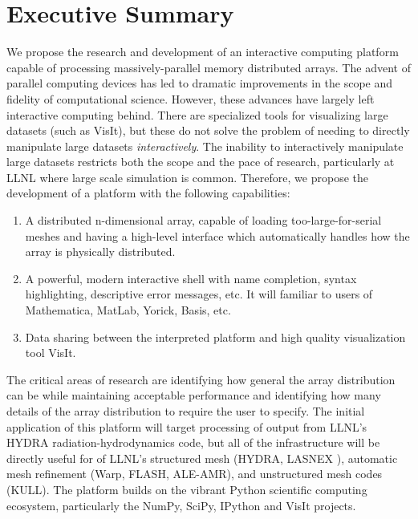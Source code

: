 \documentclass[letterpaper,12pt]{article}
\begin{document}



\setlength{\parindent}{15pt}
\section*{Executive Summary }
We propose the research and development of an interactive computing platform capable of processing massively-parallel memory distributed arrays.  The advent of parallel computing devices has led to dramatic improvements in the scope and fidelity of computational science.  However, these advances have largely left interactive computing behind.  There are specialized tools for visualizing large datasets (such as VisIt\cite{VisIt}), but these do not solve the problem of needing to directly manipulate large datasets \emph{interactively}.  The inability to interactively manipulate large datasets restricts both the scope and the pace of research, particularly at LLNL where large scale simulation is common.  Therefore, we propose the development of a platform with the following capabilities:

\begin{enumerate}
	\item A distributed n-dimensional array, capable of loading too-large-for-serial meshes 
          and having a high-level interface which automatically handles how 
          the array is physically distributed.

	\item A powerful, modern interactive shell with name completion, syntax highlighting, descriptive error messages, etc.  It will familiar to users of Mathematica, MatLab, Yorick, Basis, etc.

	\item Data sharing between the interpreted platform and high quality visualization tool VisIt.
\end{enumerate}

The critical areas of research are identifying how general the array distribution can be 
while maintaining acceptable performance and identifying how many details of the array 
distribution to require the user to specify.  The initial application of this platform 
will target processing of output from LLNL's HYDRA\cite{Marinak2001} radiation-hydrodynamics 
code, but all of the infrastructure will be directly useful for of LLNL's structured mesh 
(HYDRA, LASNEX\cite{needed} %
), automatic mesh refinement (Warp\cite{Grote2005}, FLASH\cite{flash}, ALE-AMR\cite{Koniges2010}), and 
unstructured mesh codes (KULL\cite{needed}).  The platform builds on the vibrant Python scientific computing 
ecosystem, particularly the NumPy\cite{Oliphant2006}, SciPy\cite{numpyscipy}, 
IPython\cite{ipython} and VisIt projects.
\end{document}
